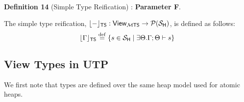 \textbf{Definition 14} (Simple Type Reification) : \textbf{Parameter F}.

The simple type reification,
$\lfloor{-}\rfloor_{\mathsf{TS}} : \mathsf{View}_{\mathcal M \mathsf{TS}} \rightarrow \mathcal{P}(\mathcal{S}_{\mathsf{H}})$,
is defined as follows:
\[
  \lfloor{\Gamma}\rfloor_{\mathsf{TS}}
  \stackrel{\mathrm{def}}{=} \{ s \in \mathcal{S}_{\mathsf{H}} \mid \exists \Theta . \Gamma;\Theta \vdash s\}
\]

\subsection{View Types in UTP}

We first note that types are defined over the same heap model
used for atomic heaps.
